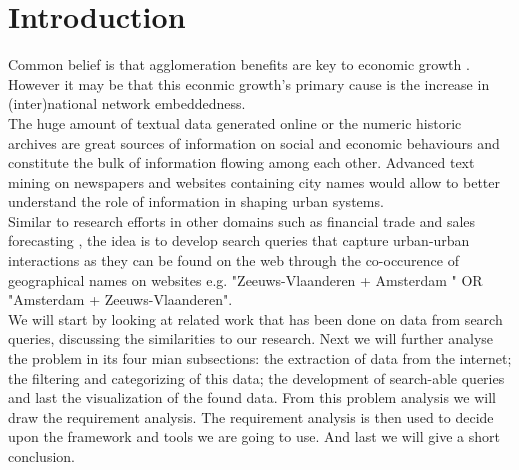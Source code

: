 \section{Introduction}


Common belief is that agglomeration benefits are key to economic growth \cite{porter2000location}. 
However it may be that this econmic growth's primary cause is the increase in (inter)national network embeddedness. \\

The huge amount of textual data generated online or the numeric historic archives are great sources of information on social and economic behaviours and constitute the bulk of information flowing among each other. Advanced text mining on newspapers and websites containing city names would allow to better understand the role of information in shaping urban systems. \\
Similar to research efforts in other domains such as financial trade \cite{preis2013quantifying} and sales forecasting \cite{wu2014future}, the idea is to develop search queries that capture urban-urban interactions as they can be found on the web through the co-occurence of geographical names on websites e.g. "Zeeuws-Vlaanderen + Amsterdam " OR "Amsterdam + Zeeuws-Vlaanderen". \\

We will start by looking at related work that has been done on data from search queries, discussing the similarities to our research. Next we will further analyse the problem in its four mian subsections: the extraction of data from the internet; the filtering and categorizing of this data; the development of search-able queries and last the visualization of the found data. From this problem analysis we will draw the requirement analysis. The requirement analysis is then used to decide upon the framework and tools we are going to use. And last we will give a short conclusion.